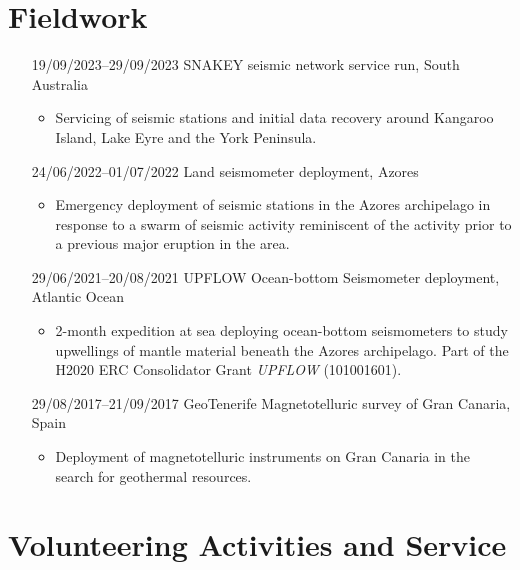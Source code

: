 \section{Fieldwork}

\begin{itemize}
    \item[19/09/2023--29/09/2023] SNAKEY seismic network service run, South Australia
        \begin{itemize}
            \item Servicing of seismic stations and initial data recovery around Kangaroo Island, Lake Eyre and the York Peninsula.
        \end{itemize}
    \item[24/06/2022--01/07/2022] Land seismometer deployment, Azores
        \begin{itemize}
            \item Emergency deployment of seismic stations in the Azores archipelago in response to a swarm of seismic activity reminiscent of the activity prior to a previous major eruption in the area.
        \end{itemize}
    \item[29/06/2021--20/08/2021] UPFLOW Ocean-bottom Seismometer deployment, Atlantic Ocean
        \begin{itemize}
            \item 2-month expedition at sea deploying ocean-bottom seismometers to study upwellings of mantle material beneath the Azores archipelago.  Part of the H2020 ERC Consolidator Grant \textit{UPFLOW} (101001601).
        \end{itemize}
    \item[29/08/2017--21/09/2017] GeoTenerife Magnetotelluric survey of Gran Canaria, Spain
        \begin{itemize}
            \item Deployment of magnetotelluric instruments on Gran Canaria in the search for geothermal resources.
        \end{itemize}
\end{itemize}

\section{Volunteering Activities and Service}

